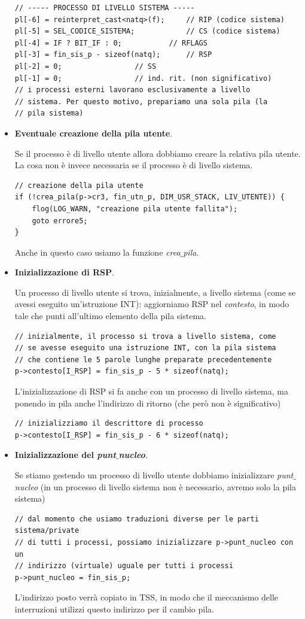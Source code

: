 \documentclass[11pt]{report}
\theoremstyle{definition}
\begin{document}
\begin{itemize}
\begin{verbatim}
// ----- PROCESSO DI LIVELLO SISTEMA -----
pl[-6] = reinterpret_cast<natq>(f);  	// RIP (codice sistema)
pl[-5] = SEL_CODICE_SISTEMA;            // CS (codice sistema)
pl[-4] = IF ? BIT_IF : 0;  	        // RFLAGS
pl[-3] = fin_sis_p - sizeof(natq);      // RSP
pl[-2] = 0;			        // SS
pl[-1] = 0;			        // ind. rit. (non significativo)
// i processi esterni lavorano esclusivamente a livello
// sistema. Per questo motivo, prepariamo una sola pila (la
// pila sistema)
\end{verbatim}
\normalsize 

\item \textbf{Eventuale creazione della pila utente}.

Se il processo è di livello utente allora dobbiamo creare la relativa pila utente. La cosa non è invece necessaria se il processo è di livello sistema. 
\small
\begin{verbatim}
// creazione della pila utente
if (!crea_pila(p->cr3, fin_utn_p, DIM_USR_STACK, LIV_UTENTE)) {
    flog(LOG_WARN, "creazione pila utente fallita");
    goto errore5;
}
\end{verbatim}
\normalsize 
Anche in questo caso usiamo la funzione \emph{crea$\_$pila}. 
\item \textbf{Inizializzazione di RSP}. 

Un processo di livello utente si trova, inizialmente, a livello sistema (come se avessi eseguito un'istruzione INT): aggiorniamo RSP nel \emph{contesto}, in modo tale che punti all'ultimo elemento della pila sistema.
\small 
\begin{verbatim}
// inizialmente, il processo si trova a livello sistema, come
// se avesse eseguito una istruzione INT, con la pila sistema
// che contiene le 5 parole lunghe preparate precedentemente
p->contesto[I_RSP] = fin_sis_p - 5 * sizeof(natq);
\end{verbatim}
\normalsize 
L'inizializzazione di RSP si fa anche con un processo di livello sistema, ma ponendo in pila anche l'indirizzo di ritorno (che però non è significativo)
\small 
\begin{verbatim}
// inizializziamo il descrittore di processo
p->contesto[I_RSP] = fin_sis_p - 6 * sizeof(natq);
\end{verbatim}
\normalsize 

\item \textbf{Inizializzazione del \emph{punt$\_$nucleo}}.

Se stiamo gestendo un processo di livello utente dobbiamo inizializzare \emph{punt$\_$nucleo} (in un processo di livello sistema non è necessario, avremo solo la pila sistema)
\small
\begin{verbatim}
// dal momento che usiamo traduzioni diverse per le parti sistema/private
// di tutti i processi, possiamo inizializzare p->punt_nucleo con un
// indirizzo (virtuale) uguale per tutti i processi
p->punt_nucleo = fin_sis_p;
\end{verbatim}
\normalsize  L'indirizzo posto verrà copiato in TSS, in modo che il meccanismo delle interruzioni utilizzi questo indirizzo per il cambio pila. 


\end{itemize}
\end{document}
